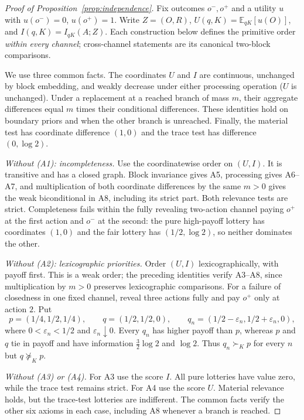 \documentclass[11pt,a4paper]{article}
\theoremstyle{definition}
\newcommand{\E}{\mathbb E}
\newcommand{\I}{I}
\newcommand{\1}{\mathbf 1}
\begin{document}
\begin{proof}[Proof of Proposition~\ref{prop:independence}]
Fix outcomes $o^-,o^+$ and a utility $u$ with $u(o^-)=0$, $u(o^+)=1$.
Write $Z=(O,R)$, $U(q,K)=\E_{qK}[u(O)]$, and
$I(q,K)=\I_{qK}(A;Z)$.  Each construction below defines the primitive
order \emph{within every channel}; cross-channel statements are its canonical
two-block comparisons.

We use three common facts.  The coordinates $U$ and $I$ are continuous,
unchanged by block embedding, and weakly decrease under either processing
operation ($U$ is unchanged).  Under a replacement at a reached branch of
mass $m$, their aggregate differences equal $m$ times their conditional
differences.  These identities hold on boundary priors and when the other
branch is unreached.  Finally, the material test has coordinate difference
$(1,0)$ and the trace test has difference $(0,\log2)$.

\emph{Without \textup{(A1)}: incompleteness.}
Use the coordinatewise order on $(U,I)$.  It is transitive and has a closed
graph.  Block invariance gives A5, processing gives A6--A7, and multiplication
of both coordinate differences by the same $m>0$ gives the weak biconditional
in A8, including its strict part.  Both relevance tests are strict.
Completeness fails within the fully revealing two-action channel paying
$o^+$ at the first action and $o^-$ at the second: the pure high-payoff
lottery has coordinates $(1,0)$ and the fair lottery has
$(1/2,\log2)$, so neither dominates the other.

\emph{Without \textup{(A2)}: lexicographic priorities.}
Order $(U,I)$ lexicographically, with payoff first.  This is a weak order;
the preceding identities verify A3--A8, since multiplication by $m>0$
preserves lexicographic comparisons.  For a failure of closedness in one
fixed channel, reveal three actions fully and pay $o^+$ only at action $2$.
Put
\[
 p=(1/4,1/2,1/4),\qquad q=(1/2,1/2,0),\qquad
 q_n=(1/2-\varepsilon_n,1/2+\varepsilon_n,0),
\]
where $0<\varepsilon_n<1/2$ and $\varepsilon_n\downarrow0$.
Every $q_n$ has higher payoff than $p$, whereas $p$ and $q$ tie in payoff
and have information $\tfrac32\log2$ and $\log2$.  Thus
$q_n\succ_Kp$ for every $n$ but $q\not\succeq_Kp$.

\emph{Without \textup{(A3)} or \textup{(A4)}.}
For A3 use the score $I$.  All pure lotteries have value zero, while the
trace test remains strict.  For A4 use the score $U$.  Material relevance
holds, but the trace-test lotteries are indifferent.  The common facts
verify the other six axioms in each case, including A8 whenever a branch
is reached.


\end{proof}
\end{document}

